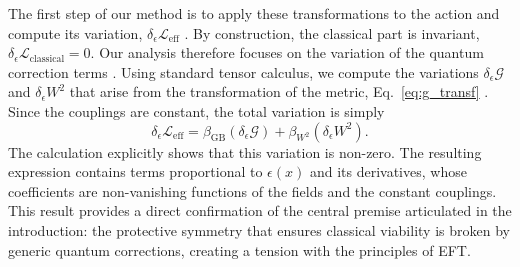 \documentclass[twocolumn]{aastex631}
\begin{document}
The first step of our method is to apply these transformations to the action and compute its variation, $\delta_\epsilon \mathcal{L}_{\text{eff}}$ \citep{wetterich2024fieldtransformationsfunctionalintegral}. By construction, the classical part is invariant, $\delta_\epsilon \mathcal{L}_{\text{classical}} = 0$. Our analysis therefore focuses on the variation of the quantum correction terms \citep{gattus2024supergeometricquantumeffectiveaction}. Using standard tensor calculus, we compute the variations $\delta_\epsilon \mathcal{G}$ and $\delta_\epsilon W^2$ that arise from the transformation of the metric, Eq.~\eqref{eq:g_transf} \citep{wetterich2024fieldtransformationsfunctionalintegral}. Since the couplings are constant, the total variation is simply
\begin{equation}
\delta_\epsilon \mathcal{L}_{\text{eff}} = \beta_{\text{GB}} (\delta_\epsilon \mathcal{G}) + \beta_{W^2} (\delta_\epsilon W^2).
\end{equation}
The calculation explicitly shows that this variation is non-zero. The resulting expression contains terms proportional to $\epsilon(x)$ and its derivatives, whose coefficients are non-vanishing functions of the fields and the constant couplings. This result provides a direct confirmation of the central premise articulated in the introduction: the protective symmetry that ensures classical viability is broken by generic quantum corrections, creating a tension with the principles of EFT.
\end{document}
